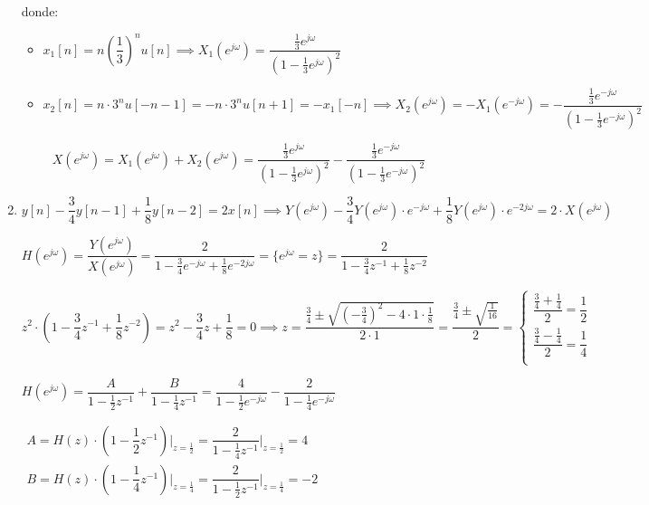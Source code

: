 \begin{enumerate}[label=\color{red}\textbf{\arabic*)}]
donde:
\begin{itemize}[label=\textbullet]
    \item $x_1[n]=n\left( \dfrac{1}{3} \right) ^n u[n]\implies X_1(e^{j\omega} )=\dfrac{\frac{1}{3} e^{j\omega} }{\left(1-\frac{1}{3} e^{j\omega} \right)^2}$
    \item $x_2[n]=n\cdot 3^nu[-n-1]=-n\cdot 3^nu[n+1]=-x_1[-n]\implies X_2(e^{j\omega} )=-X_1(e^{-j\omega} )=-\dfrac{\frac{1}{3} e^{-j\omega} }{\left( 1-\frac{1}{3} e^{-j\omega}  \right) ^2}$
\end{itemize}
\[
X(e^{j\omega} )=X_1(e^{j\omega} )+X_2(e^{j\omega} )=\dfrac{\frac{1}{3} e^{j\omega} }{\left( 1-\frac{1}{3} e^{j\omega}  \right) ^2}-\dfrac{\frac{1}{3}e^{-j\omega}}{\left( 1-\frac{1}{3} e^{-j\omega} \right) ^2}
\] 
\newpage
\item {} 
$y[n]-\dfrac{3}{4}y[n-1]+\dfrac{1}{8}y[n-2]=2x[n]\implies Y(e^{j\omega} )-\dfrac{3}{4}Y(e^{j\omega} )\cdot e^{-j\omega} +\dfrac{1}{8}Y(e^{j\omega} )\cdot e^{-2j\omega}=2\cdot X(e^{j\omega} ) $
    
$H(e^{j\omega} )=\dfrac{Y(e^{j\omega} )}{X(e^{j\omega} )}=\dfrac{2}{1-\frac{3}{4} e^{-j\omega} +\frac{1}{8} e^{-2j\omega} }=\{e^{j\omega}=z \}=\dfrac{2}{1-\frac{3}{4} z^{-1}+\frac{1}{8}z^{-2}} $

$z^2\cdot \left( 1-\dfrac{3}{4} z^{-1}+\dfrac{1}{8}z^{-2} \right) =z^2-\dfrac{3}{4}z+\dfrac{1}{8}=0\implies z=\dfrac{\frac{3}{4} \pm\sqrt{\left( -\frac{3}{4}  \right) ^2-4\cdot 1\cdot \frac{1}{8} } }{2\cdot 1}=\dfrac{\frac{3}{4} \pm\sqrt{\frac{1}{16}} }{2}=\begin{cases}
    \dfrac{\frac{3}{4} +\frac{1}{4} }{2}=\dfrac{1}{2}\\
    \dfrac{\frac{3}{4} -\frac{1}{4} }{2}=\dfrac{1}{4}\\
\end{cases}$

$H(e^{j\omega} )=\dfrac{A}{1-\frac{1}{2} z^{-1}}+\dfrac{B}{1-\frac{1}{4} z^{-1}}=\dfrac{4}{1-\frac{1}{2}e^{-j\omega}  }-\dfrac{2}{1-\frac{1}{4} e^{-j\omega} }$

$\begin{array}{l}
    A=H(z)\cdot \left( 1-\dfrac{1}{2}z^{-1} \right)\Bigg|_{z=\frac{1}{2}}=\dfrac{2}{1-\frac{1}{4} z^{-1}}\Bigg|_{z=\frac{1}{2} }=4\\
    B=H(z)\cdot \left( 1-\dfrac{1}{4}z^{-1} \right)\Bigg|_{z=\frac{1}{4}}=\dfrac{2}{1-\frac{1}{2} z^{-1}}\Bigg|_{z=\frac{1}{4} }=-2\\
\end{array}$


\end{enumerate}
